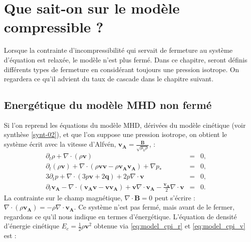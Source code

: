 \chapter{Que sait-on sur le modèle compressible ?}
\renewcommand\partie{\Partie\ Chapitre \thechapter}
\label{ch-12}

\minitoc  

\bigskip

Lorsque la contrainte d'incompressibilité qui servait de fermeture au système d'équation est relaxée, le modèle n'est plus fermé. Dans ce chapitre, seront définis différents types de fermeture en considérant toujours une pression isotrope. On regardera ce qu'il advient du taux de cascade dans le chapitre suivant.   

\section{Energétique du modèle \acs{MHD} non fermé}
\label{sec-121}
Si l'on reprend les équations du modèle \acs{MHD}, dérivées du modèle cinétique (voir synthèse \ref{synt-02}), et que l'on suppose une pression isotrope, on obtient le système écrit avec la vitesse d'Alfvén, $\boldsymbol{v_A}=\frac{\boldsymbol{B}}{\sqrt{\mu_0\rho}}$, : 
\begin{eqnarray}
\partial_t \rho + \nabla \cdot \left(\rho \boldsymbol{v}\right) &=& 0 \label{eq:model_cpi_r}, \\
\partial_t \left(\rho \boldsymbol{v}\right) + \nabla \cdot \left(\rho \boldsymbol{v}\boldsymbol{v} - \rho \boldsymbol{v_A}\boldsymbol{v_A}\right) +  \nabla p_*  &=& 0 \label{eq:model_cpi_v}, \\
3 \partial_t p + \nabla \cdot \left( 3 p\boldsymbol{v} + 2\boldsymbol{q}\right) + 2 p \nabla \cdot \boldsymbol{v} & =& 0 \label{eq:model_cpi_p}, \\
\partial_t \boldsymbol{v_A} -  \nabla \cdot \left(\boldsymbol{v_A}\boldsymbol{v} - \boldsymbol{v}\boldsymbol{v_A}\right) +  \boldsymbol{v}  \nabla \cdot \boldsymbol{v_A} -  \frac{\boldsymbol{v_A}}{2}  \nabla \cdot \boldsymbol{v} &=& 0 .\label{eq:model_cpi_b}
\end{eqnarray}
La contrainte sur le champ magnétique, $\nabla \cdot \boldsymbol{B}=0$ peut s'écrire : $\nabla \cdot \left(\rho \boldsymbol{v_A}\right) = - \rho \nabla \cdot \boldsymbol{v_A} $.
Ce système n'est pas fermé, mais avant de le fermer, regardons ce qu'il nous indique en termes d'énergétique.  
L'équation de densité d'énergie cinétique $E_c = \frac{1}{2}\rho \boldsymbol{v}^2$ obtenue via \eqref{eq:model_cpi_r} et \eqref{eq:model_cpi_v} est :
